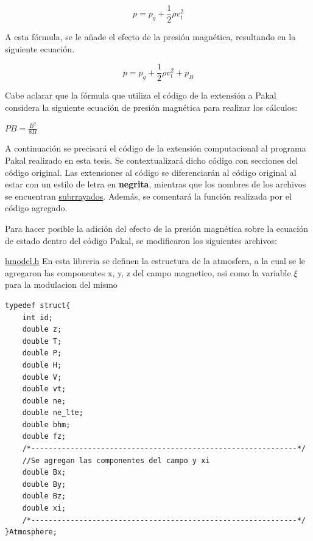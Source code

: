 \documentclass[9pt]{book}
\begin{document}
\begin{equation*} \label{ecuacion_presion}
p = p_g + \frac{1}{2}\rho v_t^2
\end{equation*}


A esta f\'ormula, se le a\~nade el efecto de la presi\'on magn\'etica, resultando en la siguiente ecuaci\'on\cite{priest}.

\begin{equation*} \label{mhs}
p = p_g + \frac{1}{2}\rho v_t^2 + p_B
\end{equation*}

Cabe aclarar que la f\'ormula que utiliza el c\'odigo de la extensi\'on a Pakal considera la siguiente ecuaci\'on de presi\'on magn\'etica para realizar los c\'alculos:

$PB = \frac{B^2}{8\Pi}$

A continuaci\'on se precisar\'a el c\'odigo de la extensi\'on computacional al programa Pakal realizado en esta tesis. Se contextualizar\'a dicho c\'odigo con secciones del c\'odigo original. Las extensiones al c\'odigo se diferenciar\'an al c\'odigo original al estar con un estilo de letra en \textbf{negrita}, mientras que los nombres de los archivos se encuentran \underline{subrrayados}. Adem\'as, se comentar\'a la funci\'on realizada por el c\'odigo agregado. 

Para hacer posible la adici\'on del efecto de la presi\'on magn\'etica sobre la ecuaci\'on de estado dentro del c\'odigo Pakal, se modificaron los siguientes archivos:\newline

\underline{hmodel.h}
En esta libreria se definen la estructura de la atmosfera, a la cual se le agregaron las componentes x, y, z del campo magnetico, asi como la variable $\xi$ para la modulacion del mismo
\begin{lstlisting}[style=CStyle]
typedef struct{
	int id;
	double z;
	double T;
	double P;
	double H;
	double V;
	double vt;
	double ne;
	double ne_lte;
	double bhm;
	double fz;
	/*-------------------------------------------------------------*/
	//Se agregan las componentes del campo y xi
	double Bx;
	double By;
	double Bz;
	double xi;
	/*-------------------------------------------------------------*/	
}Atmosphere;

\end{lstlisting}
\end{document}
